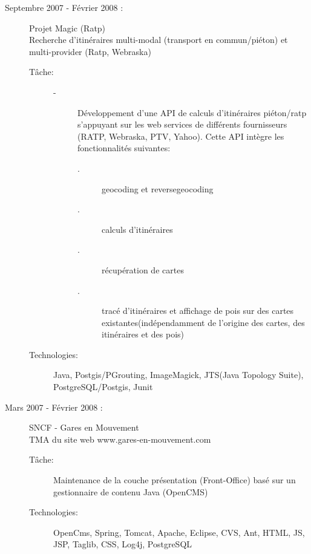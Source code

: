\documentclass[11pt, a4paper, french]{article}
\begin{document}
\begin{description}
\item[Septembre 2007 - F\'evrier 2008 :] Projet Magic (Ratp)\\
  Recherche d'itin\'eraires multi-modal (transport en commun/pi\'eton) et multi-provider (Ratp, Webraska)
  \begin{description}
  \item[T\^ache:]
    \begin{description}
    \item[-] D\'eveloppement d'une API de calculs d'itin\'eraires pi\'eton/ratp s'appuyant sur les web services de diff\'erents fournisseurs (RATP, Webraska, PTV, Yahoo). Cette API int\`egre les fonctionnalit\'es suivantes:
      \begin{description}
        \item[.] geocoding et reversegeocoding
        \item[.] calculs d'itin\'eraires
        \item[.] r\'ecup\'eration de cartes
        \item[.] trac\'e d'itin\'eraires et affichage de pois sur des cartes existantes(ind\'ependamment de l'origine des cartes, des itin\'eraires et des pois) 
      \end{description}
    \end{description}
    
  \item[Technologies:] Java, Postgis/PGrouting, ImageMagick, JTS(Java Topology Suite), PostgreSQL/Postgis, Junit
  \end{description}
  
\item[Mars 2007 - F\'evrier 2008 :] SNCF - Gares en Mouvement\\
  TMA du site web www.gares-en-mouvement.com
  \begin{description}
  \item[T\^ache:] Maintenance de la couche pr\'esentation (Front-Office) bas\'e sur un gestionnaire de contenu Java (OpenCMS)
    
  \item[Technologies:] OpenCms, Spring, Tomcat, Apache, Eclipse, CVS, Ant, HTML, JS, JSP, Taglib, CSS, Log4j, PostgreSQL
    
    
  \end{description}


\end{description}
\end{document}
